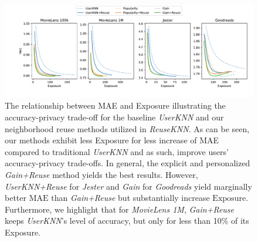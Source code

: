 \documentclass[manuscript,review,anonymous]{acmart}
\begin{document}
\begin{figure}[!t]
    \centering
    \includegraphics[width=\linewidth]{figures/tradeoff.pdf}
    \caption{The relationship between MAE and Exposure illustrating the accuracy-privacy trade-off for the baseline \emph{UserKNN} and our neighborhood reuse methods utilized in \emph{ReuseKNN}. As can be seen, our methods exhibit less Exposure for less increase of MAE compared to traditional \emph{UserKNN} and as such, improve users' accuracy-privacy trade-offs. In general, the explicit and personalized \emph{Gain+Reuse} method yields the best results. However, \emph{UserKNN+Reuse} for \emph{Jester} and \emph{Gain} for \emph{Goodreads} yield marginally better $\mathrm{MAE}$ than \emph{Gain+Reuse} but substantially increase $\mathrm{Exposure}$. Furthermore, we highlight that for \emph{MovieLens 1M}, \emph{Gain+Reuse} keeps \emph{UserKNN}'s level of accuracy, but only for less than 10\% of its Exposure.
    }
    \label{fig:results_trade-off}
\end{figure}
\end{document}
